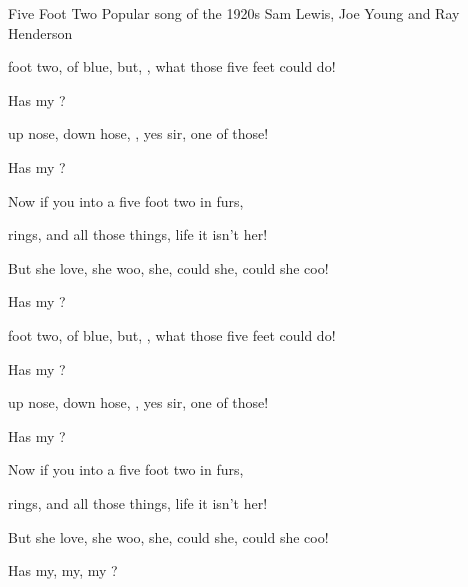 \begin{SBSong}{Five Foot Two}
  {Popular song of the 1920s}
  {Sam Lewis, Joe Young and Ray Henderson}
  \begin{SBVerse}
     foot two,  of blue, but, , what those five feet could do!
    
    Has   my ? 
     
     up nose,  down hose, , yes sir, one of those!

    Has   my ?
    
    Now if you  into a five foot two  in furs,
    
     rings, and all those things,   life it isn't her!
    
    But  she love,  she woo,  she, could she, \WBLineBrk could she coo!

    Has   my ? 
  \end{SBVerse}
  \ifChordBk
    \begin{SBVerse}
  
       foot two,  of blue, but, , what those five feet could do!
    
      Has   my ? 
     
       up nose,  down hose, , yes sir, one of those!

      Has   my ?
    
      Now if you  into a five foot two  in furs,
    
       rings, and all those things,   life it isn't her!
    
      But  she love,  she woo,  she, could she, could she coo!

      Has   my,   my,   my ?
    \end{SBVerse}
  \fi
\end{SBSong}
